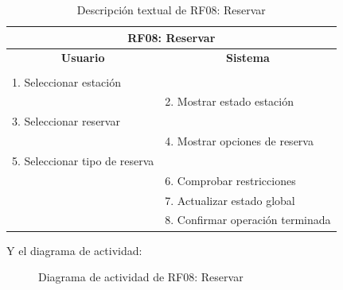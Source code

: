 \begin{itemize}
	\begin{table}[h]
		\centering	
		\begin{tabular}{|l|l|}
			\hline
			\multicolumn{2}{|c|}{\textbf{RF08: Reservar}} \\ \hline
			\multicolumn{1}{|c|}{\textbf{Usuario}} & \multicolumn{1}{c|}{\textbf{Sistema}} \\ \hline
			[Pto. inclusión: RF02: Loguear usuario] &\\ \hline
			1. Seleccionar estación &\\ \hline
			& 2. Mostrar estado estación \\ \hline
			3. Seleccionar reservar &\\ \hline
			& 4. Mostrar opciones de reserva \\ \hline
			5. Seleccionar tipo de reserva &\\ \hline
			& 6. Comprobar restricciones \\ \hline
			& 7. Actualizar estado global \\ \hline
			& 8. Confirmar operación terminada \\ \hline 
		\end{tabular}
		\caption{Descripción textual de RF08: Reservar}
		\label{tab:tablaDescTextualRF08}
	\end{table}
	
	Y el diagrama de actividad:
	
	\begin{figure}[!htb]
		\centering
		\caption{Diagrama de actividad de RF08: Reservar}
		\label{fig:diagramaActividad_RF08}
	\end{figure}
	

\end{itemize}
